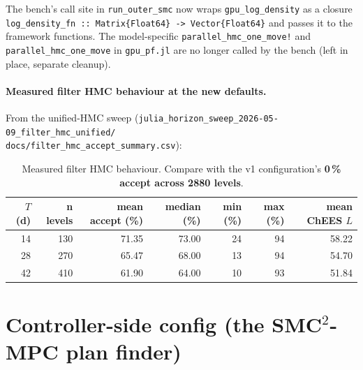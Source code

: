 \documentclass[11pt,a4paper]{article}
\begin{document}
The bench's call site in \texttt{run\_outer\_smc} now wraps
\texttt{gpu\_log\_density} as a closure
\texttt{log\_density\_fn :: Matrix\{Float64\} -> Vector\{Float64\}}
and passes it to the framework functions. The model-specific
\texttt{parallel\_hmc\_one\_move!} and
\texttt{parallel\_hmc\_one\_move} in \texttt{gpu\_pf.jl} are no
longer called by the bench (left in place, separate cleanup).

\paragraph{Measured filter HMC behaviour at the new defaults.}
From the unified-HMC sweep
(\texttt{julia\_horizon\_sweep\_2026-05-09\_filter\_hmc\_unified/}\\
\texttt{docs/filter\_hmc\_accept\_summary.csv}):

\begin{table}[ht]
\centering
\small
\begin{tabular}{rrrrrrr}
\toprule
$T$ (d) & n levels & mean accept (\%) & median (\%) & min (\%) & max (\%) & mean ChEES $L$ \\
\midrule
14 & 130 & 71.35 & 73.00 & 24 & 94 & 58.22 \\
28 & 270 & 65.47 & 68.00 & 13 & 94 & 54.70 \\
42 & 410 & 61.90 & 64.00 & 10 & 93 & 51.84 \\
\bottomrule
\end{tabular}
\caption{Measured filter HMC behaviour. Compare with the v1
configuration's \textbf{0\,\% accept across 2880 levels}.}
\label{tab:filter_hmc_meas}
\end{table}


\section{Controller-side config (the SMC$^2$-MPC plan finder)}
\label{sec:ctrl_cfg}
\end{document}
